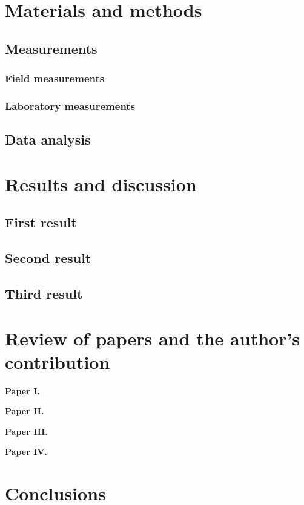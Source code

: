 \documentclass[a4paper,12pt]{article}
\begin{document}
\section{Materials and methods}

\subsection{Measurements}

\subsubsection{Field measurements}
\lipsum[1]

\subsubsection{Laboratory measurements}
\lipsum[2]

\subsection{Data analysis}
\lipsum[3] 

\section{Results and discussion}
\lipsum[1]

\subsection{First result}
\lipsum[2]

\subsection{Second result}
\lipsum[3]

\subsection{Third result}
\lipsum[4]

\section{Review of papers and the author's contribution}

{\bf Paper I.} \lipsum[75]

{\bf Paper II.} \lipsum[75]

{\bf Paper III.} \lipsum[75]

{\bf Paper IV.} \lipsum[75]

\section{Conclusions}
\lipsum[5]

\newpage

\printbibliography[heading=bibintoc, title={References}]
\end{document}
